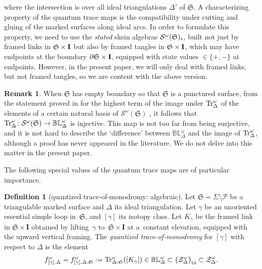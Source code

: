 \documentclass[pdftex]{sigma}
\numberwithin{equation}{section}
\theoremstyle{definition}
\newtheorem{Definition}[Theorem]{Definition}
\newtheorem{Remark}[Theorem]{Remark}
\begin{document}
where the intersection is over all ideal triangulations $\Delta'$ of $\mathfrak{S}$. A characterizing property of the quantum trace maps is the compatibility under cutting and gluing of the marked surfaces along ideal arcs. In order to formulate this property, we need to use the {\em stated} skein algebras $\mathcal{S}^\omega(\mathfrak{S})_{\rm s}$, built not just by framed links in $\mathfrak{S} \times {\bf I}$ but also by framed tangles in $\mathfrak{S} \times {\bf I}$, which may have endpoints at the boundary $\partial \mathfrak{S} \times {\bf I}$, equipped with state values $\in \{+,-\}$ at endpoints. However, in the present paper, we will only deal with framed links, but not framed tangles, so we are content with the above version.
\begin{Remark}
\label{rem:highest_term}
When $\mathfrak{S}$ has empty boundary so that $\mathfrak{S}$ is a punctured surface, from the statement proved in \cite{AK} for the highest term of the image under ${\rm Tr}^\omega_\Delta$ of the elements of a certain natural basis of $\mathcal{S}^\omega(\mathfrak{S})$ \cite{DThurston}, it follows that ${\rm Tr}^\omega_\Delta \colon \mathcal{S}^\omega(\mathfrak{S}) \to \mathbb{BL}^\omega_\Delta$ is injective. This map is not too far from being surjective, and it is not hard to describe the `difference' between $\mathbb{BL}^\omega_\Delta$ and the image of ${\rm Tr}^\omega_\Delta$, although a proof has never appeared in the literature. We do not delve into this matter in the present paper.
\end{Remark}
The following special values of the quantum trace maps are of particular importance.
\begin{Definition}[quantized trace-of-monodromy: algebraic]
\label{def:quantized_trace-of-monodromy}
Let $\mathfrak{S} = \Sigma\setminus\mathcal{P}$ be a triangulable marked surface and $\Delta$ its ideal triangulation. Let $\gamma$ be an unoriented essential simple loop in~$\mathfrak{S}$, and $[\gamma]$ its isotopy class. Let $K_\gamma$ be the framed link in $\mathfrak{S} \times \mathbf{I}$ obtained by lifting~$\gamma$ to~$\mathfrak{S} \times \mathbf{I}$ at a~constant elevation, equipped with the upward vertical framing. The {\em quantized trace-of-monodromy} for $[\gamma]$ with respect to $\Delta$ is the element
\begin{align}
\label{eq:f_omega}
f^\omega_{[\gamma],\Delta} = f^\omega_{[\gamma],\Delta;\mathfrak{S}} := {\rm Tr}^\omega_{\Delta;\mathfrak{S}}([K_\gamma]) \in
\mathbb{BL}^\omega_\Delta \subset \bigl(\mathcal{Z}^\omega_\Delta\bigr)_{\rm bl} \subset \mathcal{Z}^\omega_\Delta.
\end{align}
\end{Definition}
\end{document}
